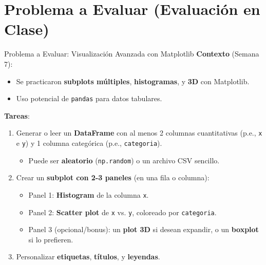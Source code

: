 \documentclass[10pt]{beamer}
\begin{document}
\section{Problema a Evaluar (Evaluación en Clase)}

\begin{frame}{Problema a Evaluar: Visualización Avanzada con Matplotlib}
  \textbf{Contexto} (Semana 7):
  \begin{itemize}
    \item Se practicaron \textbf{subplots múltiples}, \textbf{histogramas}, y \textbf{3D} con Matplotlib.
    \item Uso potencial de \texttt{pandas} para datos tabulares.
  \end{itemize}
  \vspace{0.3cm}

  \textbf{Tareas}:
  \begin{enumerate}
    \item Generar o leer un \textbf{DataFrame} con al menos 2 columnas cuantitativas (p.e., \texttt{x} e \texttt{y}) y 1 columna categórica (p.e., \texttt{categoria}).
      \begin{itemize}
        \item Puede ser \textbf{aleatorio} (\texttt{np.random}) o un archivo CSV sencillo.
      \end{itemize}
    \item Crear un \textbf{subplot con 2-3 paneles} (en una fila o columna):
      \begin{itemize}
        \item Panel 1: \textbf{Histogram} de la columna \texttt{x}.
        \item Panel 2: \textbf{Scatter plot} de \texttt{x} vs. \texttt{y}, coloreado por \texttt{categoria}.
        \item Panel 3 (opcional/bonus): un \textbf{plot 3D} si desean expandir, o un \textbf{boxplot} si lo prefieren.
      \end{itemize}
    \item Personalizar \textbf{etiquetas}, \textbf{títulos}, y \textbf{leyendas}.
  \end{enumerate}
\end{frame}
\end{document}
